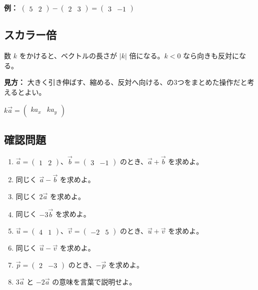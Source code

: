 \documentclass[paper=a4,fleqn,11pt]{jlreq}
\newcommand{\formula}[1]{%
  \vspace{10pt}%
  \begin{center}{\large\bfseries\boldmath\(\displaystyle #1\)}\end{center}%
  \vspace{4pt}%
}
\begin{document}
\textbf{例：} \(\begin{pmatrix}5 & 2\end{pmatrix}-\begin{pmatrix}2 & 3\end{pmatrix}=\begin{pmatrix}3 & -1\end{pmatrix}\)

\newpage
\subsection{スカラー倍}

数 \(k\) をかけると、ベクトルの長さが \(|k|\) 倍になる。\(k<0\) なら向きも反対になる。

\textbf{見方：} 大きく引き伸ばす、縮める、反対へ向ける、の3つをまとめた操作だと考えるとよい。

\formula{k\vec{a}=\begin{pmatrix}ka_x & ka_y\end{pmatrix}}

\begin{center}
\end{center}

\subsection{確認問題}
\begin{enumerate}
  \item \(\vec{a}=\begin{pmatrix}1 & 2\end{pmatrix}\)、\(\vec{b}=\begin{pmatrix}3 & -1\end{pmatrix}\) のとき、\(\vec{a}+\vec{b}\) を求めよ。
  \item 同じく \(\vec{a}-\vec{b}\) を求めよ。
  \item 同じく \(2\vec{a}\) を求めよ。
  \item 同じく \(-3\vec{b}\) を求めよ。
  \item \(\vec{u}=\begin{pmatrix}4 & 1\end{pmatrix}\)、\(\vec{v}=\begin{pmatrix}-2 & 5\end{pmatrix}\) のとき、\(\vec{u}+\vec{v}\) を求めよ。
  \item 同じく \(\vec{u}-\vec{v}\) を求めよ。
  \item \(\vec{p}=\begin{pmatrix}2 & -3\end{pmatrix}\) のとき、\(-\vec{p}\) を求めよ。
  \item \(3\vec{a}\) と \(-2\vec{a}\) の意味を言葉で説明せよ。
\end{enumerate}
\end{document}
